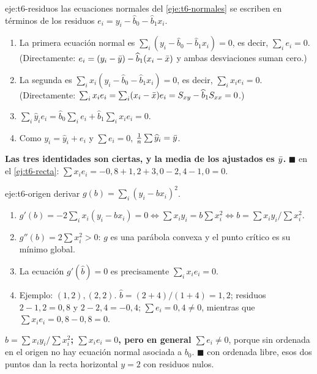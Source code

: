 \begin{solucion}{eje:t6-residuos}
\planteamiento las ecuaciones normales del \cref{eje:t6-normales} se escriben en términos de los residuos $e_i=y_i-\widehat b_0-\widehat b_1x_i$.
\pasos
\begin{enumerate}[label=\arabic*.]
  \item La primera ecuación normal es $\sum_i(y_i-\widehat b_0-\widehat b_1x_i)=0$, es decir, $\sum_ie_i=0$. (Directamente: $e_i=(y_i-\bar{y})-\widehat b_1(x_i-\bar{x})$ y ambas desviaciones suman cero.)
  \item La segunda es $\sum_ix_i(y_i-\widehat b_0-\widehat b_1x_i)=0$, es decir, $\sum_ix_ie_i=0$. (Directamente: $\sum_ix_ie_i=\sum_i(x_i-\bar{x})e_i=S_{xy}-\widehat b_1S_{xx}=0$.)
  \item $\sum_i\widehat y_ie_i=\widehat b_0\sum_ie_i+\widehat b_1\sum_ix_ie_i=0$.
  \item Como $y_i=\widehat y_i+e_i$ y $\sum e_i=0$, $\frac1n\sum\widehat y_i=\bar{y}$.
\end{enumerate}
\resultado \textbf{Las tres identidades son ciertas, y la media de los ajustados es $\bar{y}$.} $\blacksquare$
\comprobacion en el \cref{ej:t6-recta}: $\sum x_ie_i=-0{,}8+1{,}2+3{,}0-2{,}4-1{,}0=0$.
\end{solucion}

\begin{solucion}{eje:t6-origen}
\planteamiento derivar $g(b)=\sum_i(y_i-bx_i)^{2}$.
\pasos
\begin{enumerate}[label=\arabic*.]
  \item $g'(b)=-2\sum_ix_i(y_i-bx_i)=0\iff\sum x_iy_i=b\sum x_i^{2}\iff b=\sum x_iy_i/\sum x_i^{2}$.
  \item $g''(b)=2\sum x_i^{2}>0$: $g$ es una parábola convexa y el punto crítico es su mínimo global.
  \item La ecuación $g'(\widehat b)=0$ es precisamente $\sum_ix_ie_i=0$.
  \item Ejemplo: $(1,2),(2,2)$. $\widehat b=(2+4)/(1+4)=1{,}2$; residuos $2-1{,}2=0{,}8$ y $2-2{,}4=-0{,}4$; $\sum e_i=0{,}4\ne0$, mientras que $\sum x_ie_i=0{,}8-0{,}8=0$.
\end{enumerate}
\resultado \textbf{$\widehat b=\sum x_iy_i/\sum x_i^{2}$; $\sum x_ie_i=0$, pero en general $\sum e_i\neq0$}, porque sin ordenada en el origen no hay ecuación normal asociada a $b_0$. $\blacksquare$
\comprobacion con ordenada libre, esos dos puntos dan la recta horizontal $y=2$ con residuos nulos.
\end{solucion}

